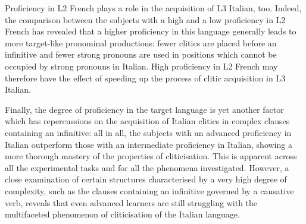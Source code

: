 \documentclass[output=paper,modfonts,nonflat,newtxmath]{langsci/langscibook}
\begin{document}
Proficiency in L2 French plays a role in the acquisition of L3 Italian, too. Indeed, the comparison between the subjects with a high and a low proficiency in L2 French has revealed that a higher proficiency in this language generally leads to more target-like pronominal productions: fewer clitics are placed before an infinitive and fewer strong pronouns are used in positions which cannot be occupied by strong pronouns in Italian. High proficiency in L2 French may therefore have the effect of speeding up the process of clitic acquisition in L3 Italian.

Finally, the degree of proficiency in the target language is yet another factor which has repercussions on the acquisition of Italian clitics in complex clauses containing an infinitive: all in all, the subjects with an advanced proficiency in Italian outperform those with an intermediate proficiency in Italian, showing a more thorough mastery of the properties of cliticisation. This is apparent across all the experimental tasks and for all the phenomena investigated. However, a close examination of certain structures characterised by a very high degree of complexity, such as the clauses containing an infinitive governed by a causative verb, reveals that even advanced learners are still struggling with the multifaceted phenomenon of cliticisation of the Italian language.

{\sloppy\printbibliography[heading=subbibliography,notkeyword=this]}
\end{document}
